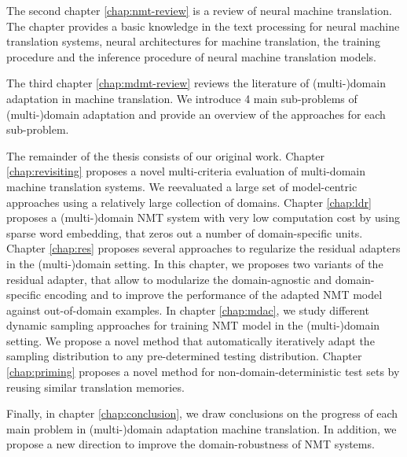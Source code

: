 The second chapter \ref{chap:nmt-review} is a review of neural machine translation. The chapter provides a basic knowledge in the text processing for neural machine translation systems, neural architectures for machine translation, the training procedure and the inference procedure of neural machine translation models.

The third chapter \ref{chap:mdmt-review} reviews the literature of (multi-)domain adaptation in machine translation. We introduce 4 main sub-problems of (multi-)domain adaptation and provide an overview of the approaches for each sub-problem.

The remainder of the thesis consists of our original work. Chapter \ref{chap:revisiting} proposes a novel multi-criteria evaluation of multi-domain machine translation systems. We reevaluated a large set of model-centric approaches using a relatively large collection of domains. Chapter \ref{chap:ldr} proposes a (multi-)domain NMT system with very low computation cost by using sparse word embedding, that zeros out a number of domain-specific units. Chapter \ref{chap:res} proposes several approaches to regularize the residual adapters \citep{Bapna19simple} in the (multi-)domain setting. In this chapter, we proposes two variants of the residual adapter, that allow to modularize the domain-agnostic and domain-specific encoding and to improve the performance of the adapted NMT model against out-of-domain examples. In chapter \ref{chap:mdac}, we study different dynamic sampling approaches for training NMT model in the (multi-)domain setting. We propose a novel method that automatically iteratively adapt the sampling distribution to any pre-determined testing distribution. Chapter \ref{chap:priming} proposes a novel method for non-domain-deterministic test sets by reusing similar translation memories.

Finally, in chapter \ref{chap:conclusion}, we draw conclusions on the progress of each main problem in (multi-)domain adaptation machine translation. In addition, we propose a new direction to improve the domain-robustness of NMT systems.

























